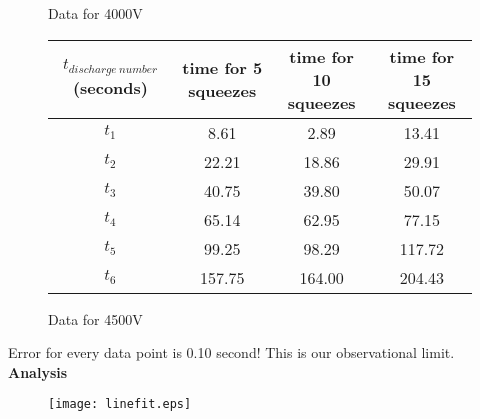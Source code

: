 \documentclass[10pt,a4paper]{article}
\begin{document}
{\begin{center}
\begin{figure} [H]
\begin{tabular}{|c |c| c|c|}
		\end{tabular}
		\caption{Data for 4000V}
	\end{figure}
\end{center}

\begin{center}
	\begin{figure} [H]
		\advance\leftskip-2cm
		\begin{tabular}{|c |c| c|c|} \hline
			$t_{discharge\ number}$ (seconds) &  time for 5 squeezes & time for 10 squeezes & time for 15 squeezes \\ [0.5ex] 
			\hline
			$t_1$ & 8.61 & 2.89 &13.41\\ 
			\hline
			$t_2$  & 22.21&18.86 &29.91 \\
			\hline
			$t_3$ &40.75 & 39.80& 50.07\\
			\hline
			$t_4$ & 65.14 & 62.95& 77.15\\
			\hline
			$t_5$ &99.25 & 98.29 &117.72\\
			\hline
			$t_6$ & 157.75 & 164.00& 204.43\\
			\hline
			
		\end{tabular}
		\caption{Data for 4500V}
	\end{figure}
\end{center}

\par Error for every data point is 0.10 second! This is our observational limit.
\newpage
\textbf{Analysis}\\[\baselineskip]
\begin{figure}[H]
	
	\texttt{[image: linefit.eps]}
	

\end{figure}}
\end{document}
